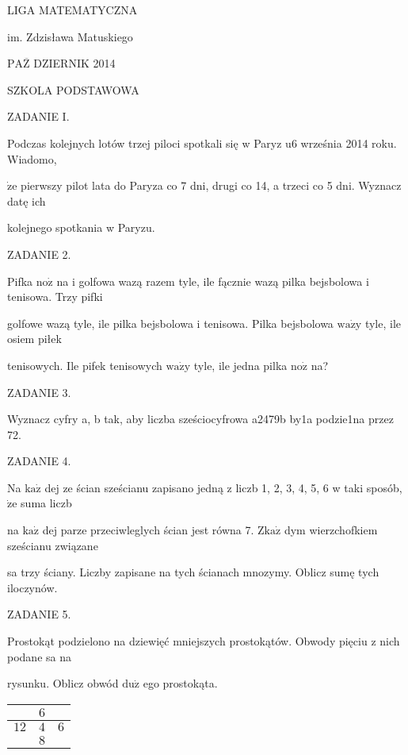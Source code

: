 \documentclass[a4paper,12pt]{article}
\begin{document}
LIGA MATEMATYCZNA

im. Zdzisława Matuskiego

$\mathrm{P}\mathrm{A}\overline{\mathrm{Z}}$ DZIERNIK 2014

SZKOLA PODSTAWOWA

ZADANIE I.

Podczas kolejnych lotów trzej piloci spotkali się w Paryz $\mathrm{u}6$ września 2014 roku. Wiadomo,

$\dot{\mathrm{z}}\mathrm{e}$ pierwszy pilot lata do Paryza co 7 dni, drugi co 14, a trzeci co 5 dni. Wyznacz datę ich

kolejnego spotkania w Paryzu.

ZADANIE 2.

Pifka $\mathrm{n}\mathrm{o}\dot{\mathrm{z}}$ na i golfowa wazą razem tyle, ile fącznie wazą pilka bejsbolowa i tenisowa. Trzy pifki

golfowe wazą tyle, ile pilka bejsbolowa i tenisowa. Pilka bejsbolowa $\mathrm{w}\mathrm{a}\dot{\mathrm{z}}\mathrm{y}$ tyle, ile osiem piłek

tenisowych. Ile pifek tenisowych $\mathrm{w}\mathrm{a}\dot{\mathrm{z}}\mathrm{y}$ tyle, ile jedna pilka $\mathrm{n}\mathrm{o}\dot{\mathrm{z}}$ na?

ZADANIE 3.

Wyznacz cyfry a, b tak, aby liczba sześciocyfrowa a2479b by1a podzie1na przez 72.

ZADANIE 4.

Na $\mathrm{k}\mathrm{a}\dot{\mathrm{z}}$ dej ze ścian sześcianu zapisano jedną z liczb 1, 2, 3, 4, 5, 6 w taki sposób, $\dot{\mathrm{z}}\mathrm{e}$ suma liczb

na $\mathrm{k}\mathrm{a}\dot{\mathrm{z}}$ dej parze przeciwleglych ścian jest równa 7. $\mathrm{Z}\mathrm{k}\mathrm{a}\dot{\mathrm{z}}$ dym wierzchofkiem sześcianu związane

sa trzy ściany. Liczby zapisane na tych ścianach mnozymy. Oblicz sumę tych iloczynów.

ZADANIE 5.

Prostokąt podzielono na dziewięć mniejszych prostokątów. Obwody pięciu z nich podane sa na

rysunku. Oblicz obwód $\mathrm{d}\mathrm{u}\dot{\mathrm{z}}$ ego prostokąta.
\begin{center}
\begin{tabular}{|l|l|l|}
\hline
\multicolumn{1}{|l|}{}&	\multicolumn{1}{|l|}{$6$}&	\multicolumn{1}{|l|}{}	\\
\hline
\multicolumn{1}{|l|}{ $12$}&	\multicolumn{1}{|l|}{ $4$}&	\multicolumn{1}{|l|}{ $6$}	\\
\hline
\multicolumn{1}{|l|}{}&	\multicolumn{1}{|l|}{ $8$}&	\multicolumn{1}{|l|}{}	\\
\hline
\end{tabular}

\end{center}
\end{document}
